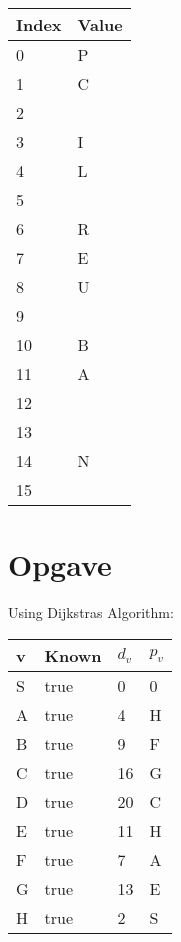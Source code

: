 \documentclass{article}
\begin{document}
\begin{table}[H]
\centering
\begin{tabular}{|l|l|}
\hline
\rowcolor[HTML]{C0C0C0} 
Index    & Value \\ \hline
0        & P    \\ \hline
1        & C     \\ \hline
2        &      \\ \hline
3        & I    \\ \hline
4        & L    \\ \hline
5        &       \\ \hline
6        & R      \\ \hline
7        & E      \\ \hline
8        & U    \\ \hline
9        &     \\ \hline
10       & B    \\ \hline
11       & A     \\ \hline
12       &       \\ \hline
13       &       \\ \hline
14       & N    \\ \hline
15       &       \\ \hline
\end{tabular}
\end{table}

\section{Opgave} %
Using Dijkstras Algorithm:
\begin{table}[H]
\centering
\begin{tabular}{|l|l|l|l|}
\hline
\rowcolor[HTML]{C0C0C0} 
v  & Known & $d_v$   & $p_v$     \\ \hline
S  & true  & 0    & 0    \\ \hline
A  & true  & 4    & H   \\ \hline
B  & true  & 9    & F   \\ \hline
C  & true  & 16   & G   \\ \hline
D  & true  & 20   & C   \\ \hline
E  & true  & 11   & H   \\ \hline
F  & true  & 7    & A   \\ \hline
G  & true  & 13   & E   \\ \hline
H  & true  & 2    & S    \\ \hline
\end{tabular}
\end{table}
\end{document}
